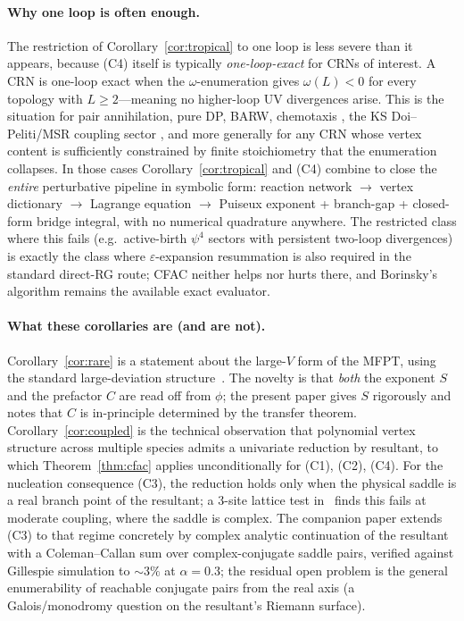\documentclass[11pt,a4paper]{article}
\theoremstyle{plain}
\theoremstyle{definition}
\begin{document}
\paragraph{Why one loop is often enough.}
The restriction of Corollary~\ref{cor:tropical} to one loop is
less severe than it appears, because (C4) itself is typically
\emph{one-loop-exact} for CRNs of interest.  A CRN is one-loop
exact when the $\omega$-enumeration gives $\omega(L) < 0$ for every
topology with $L \geq 2$---meaning no higher-loop UV divergences
arise.  This is the situation for pair annihilation, pure DP,
BARW, chemotaxis \citep{GelimsonGolestanian2015}, the KS
Doi--Peliti/MSR coupling sector \citep{PruessnerGarciaMillan2025,CFACpaper},
and more generally for any CRN whose vertex content is
sufficiently constrained by finite stoichiometry that the
enumeration collapses.  In those cases Corollary~\ref{cor:tropical}
and (C4) combine to close the \emph{entire} perturbative
pipeline in symbolic form: reaction network $\to$ vertex
dictionary $\to$ Lagrange equation $\to$ Puiseux exponent +
branch-gap + closed-form bridge integral, with no numerical
quadrature anywhere.  The restricted class where this fails
(e.g.\ active-birth $\psi^4$ sectors with persistent two-loop
divergences) is exactly the class where $\varepsilon$-expansion resummation
is also required in the standard direct-RG route; CFAC neither
helps nor hurts there, and Borinsky's algorithm remains the
available exact evaluator.

\paragraph{What these corollaries are (and are not).}
Corollary~\ref{cor:rare} is a statement about the large-$V$ form
of the MFPT, using the standard large-deviation
structure~\citep{FreidlinWentzell}.  The novelty is that
\emph{both} the exponent $S$ and the prefactor $C$ are read off
from $\phi$; the present paper gives $S$ rigorously and notes
that $C$ is in-principle determined by the transfer theorem.
Corollary~\ref{cor:coupled} is the technical observation that
polynomial vertex structure across multiple species admits a
univariate reduction by resultant, to which Theorem~\ref{thm:cfac}
applies unconditionally for (C1), (C2), (C4).  For the nucleation
consequence (C3), the reduction holds only when the physical
saddle is a real branch point of the resultant; a 3-site lattice
test in~\citep{CFACpaper} finds this fails at moderate coupling,
where the saddle is complex.  The companion paper extends (C3)
to that regime concretely by complex analytic continuation of the
resultant with a Coleman--Callan sum over complex-conjugate
saddle pairs, verified against Gillespie simulation to $\sim 3\%$
at $\alpha = 0.3$; the residual open problem is the general
enumerability of reachable conjugate pairs from the real axis (a
Galois/monodromy question on the resultant's Riemann surface).
\end{document}
